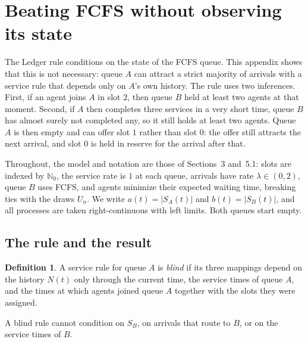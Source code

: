 \documentclass[11pt]{article}
\theoremstyle{definition}
\newtheorem{bdef}[bthm]{Definition}
\theoremstyle{remark}
\newcommand{\N}{\mathbb{N}}
\begin{document}
\appendix
\renewcommand{\thesection}{B}

\section{Beating FCFS without observing its state}\label{app:blind}

The Ledger rule conditions on the state of the FCFS queue. This appendix shows
that this is not necessary: queue $A$ can attract a strict majority of arrivals
with a service rule that depends only on $A$'s own history. The rule uses two
inferences. First, if an agent joins $A$ in slot $2$, then queue $B$ held at
least two agents at that moment. Second, if $A$ then completes three services
in a very short time, queue $B$ has almost surely not completed any, so it
still holds at least two agents. Queue $A$ is then empty and can offer slot $1$
rather than slot $0$: the offer still attracts the next arrival, and slot $0$
is held in reserve for the arrival after that.

Throughout, the model and notation are those of Sections~3 and~5.1: slots are
indexed by $\N_0$, the service rate is $1$ at each queue, arrivals have rate
$\lambda\in(0,2)$, queue $B$ uses FCFS, and agents minimize their expected
waiting time, breaking ties with the draws $U_n$. We write $a(t)=|S_A(t)|$ and
$b(t)=|S_B(t)|$, and all processes are taken right-continuous with left limits.
Both queues start empty.

\subsection{The rule and the result}

\begin{bdef}\label{def:blind}
A service rule for queue $A$ is \emph{blind} if its three mappings depend on
the history $N(t)$ only through the current time, the service times of queue
$A$, and the times at which agents joined queue $A$ together with the slots
they were assigned.
\end{bdef}

A blind rule cannot condition on $S_B$, on arrivals that route to $B$, or on
the service times of $B$.
\end{document}
